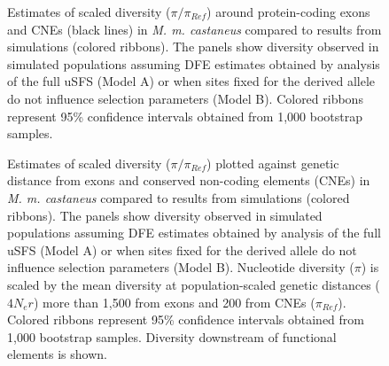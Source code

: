 \begin{figure}[H]
   \centering      
   \noindent{}
 \caption[Reductions in diversity caused by background selection and selective sweeps in simulated data - physical distance]{Estimates of scaled diversity ($\pi / \pi_{Ref}$) around protein-coding exons and CNEs (black lines) in \textit{M. m. castaneus} compared to results from simulations (colored ribbons). The panels show diversity observed in simulated populations assuming DFE estimates obtained by analysis of the full uSFS (Model A) or when sites fixed for the derived allele do not influence selection parameters (Model B). Colored ribbons represent 95\% confidence intervals obtained from 1,000 bootstrap samples.}
 \label{fig:piRef_physical}
\end{figure}

 \begin{figure}[H]
   \centering      
   \noindent{}
 \caption[Reductions in diversity caused by background selection and selective sweeps in simulated data - genetic distance]{Estimates of scaled diversity ($\pi / \pi_{Ref}$) plotted against genetic distance from exons and conserved non-coding elements (CNEs) in \textit{M. m. castaneus} compared to results from simulations (colored ribbons). The panels show diversity observed in simulated populations assuming DFE estimates obtained by analysis of the full uSFS (Model A) or when sites fixed for the derived allele do not influence selection parameters (Model B). Nucleotide diversity ($\pi$) is scaled by the mean diversity at population-scaled genetic distances ($4N_er$) more than 1,500 from exons and 200 from CNEs ($\pi_{Ref}$). Colored ribbons represent 95\% confidence intervals obtained from 1,000 bootstrap samples. Diversity downstream of functional elements is shown.}
 \label{fig:piRef_genetic}
\end{figure}

